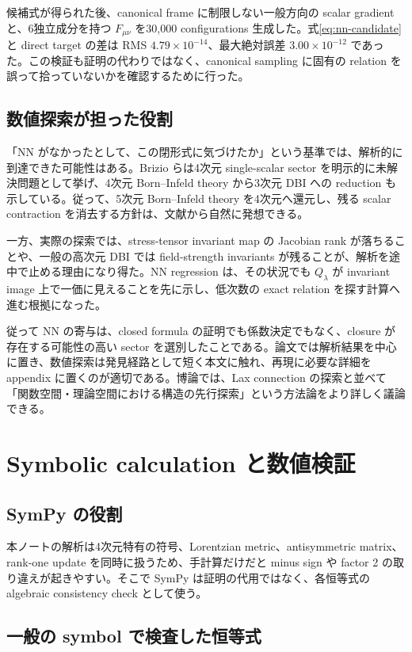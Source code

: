 \documentclass[a4paper,11pt]{ltjsreport}
\begin{document}
候補式が得られた後、canonical frame に制限しない一般方向の scalar gradient と、6独立成分を持つ $F_{\mu\nu}$ を30,000 configurations 生成した。式\eqref{eq:nn-candidate}と direct target の差は RMS $4.79\times10^{-14}$、最大絶対誤差 $3.00\times10^{-12}$ であった。この検証も証明の代わりではなく、canonical sampling に固有の relation を誤って拾っていないかを確認するために行った。

\section{数値探索が担った役割}

「NN がなかったとして、この閉形式に気づけたか」という基準では、解析的に到達できた可能性はある。Brizio らは4次元 single-scalar sector を明示的に未解決問題として挙げ、4次元 Born--Infeld theory から3次元 DBI への reduction も示している。従って、5次元 Born--Infeld theory を4次元へ還元し、残る scalar contraction を消去する方針は、文献から自然に発想できる。

一方、実際の探索では、stress-tensor invariant map の Jacobian rank が落ちることや、一般の高次元 DBI では field-strength invariants が残ることが、解析を途中で止める理由になり得た。NN regression は、その状況でも $Q_\lambda$ が invariant image 上で一価に見えることを先に示し、低次数の exact relation を探す計算へ進む根拠になった。

従って NN の寄与は、closed formula の証明でも係数決定でもなく、closure が存在する可能性の高い sector を選別したことである。論文では解析結果を中心に置き、数値探索は発見経路として短く本文に触れ、再現に必要な詳細を appendix に置くのが適切である。博論では、Lax connection の探索と並べて「関数空間・理論空間における構造の先行探索」という方法論をより詳しく議論できる。

\chapter{Symbolic calculation と数値検証}

\section{SymPy の役割}

本ノートの解析は4次元特有の符号、Lorentzian metric、antisymmetric matrix、rank-one update を同時に扱うため、手計算だけだと minus sign や factor 2 の取り違えが起きやすい。そこで SymPy は証明の代用ではなく、各恒等式の algebraic consistency check として使う。

\section{一般の symbol で検査した恒等式}
\end{document}

